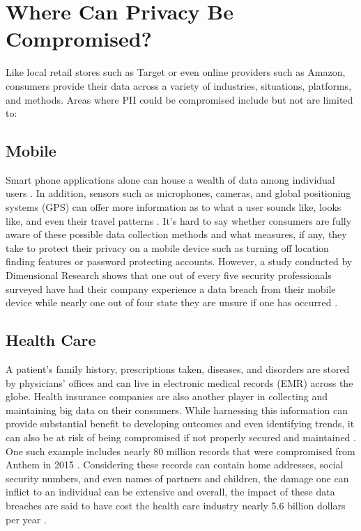 \documentclass[sigconf]{acmart}
\begin{document}
\section{Where Can Privacy Be Compromised?}
Like local retail stores such as Target or even online providers such as Amazon, consumers provide their data across a variety of industries, situations, platforms, and methods. Areas where PII could be compromised include but not are limited to:
  \subsection{Mobile} Smart phone applications alone can house a wealth of data among individual users \cite{Tene2013}. In addition, sensors such as microphones, cameras, and global positioning systems (GPS) can offer more information as to what a user sounds like, looks like, and even their travel patterns \cite{Tene2013}. It's hard to say whether consumers are fully aware of these possible data collection methods and what measures, if any, they take to protect their privacy on a mobile device such as turning off location finding features or password protecting accounts. However, a study conducted by Dimensional Research shows that one out of every five security professionals surveyed have had their company experience a data breach from their mobile device while nearly one out of four state they are unsure if one has occurred \cite{Collett2017}. 
  \subsection{Health Care} A patient's family history, prescriptions taken, diseases, and disorders are stored by physicians' offices and can live in electronic medical records (EMR) across the globe. Health insurance companies are also another player in collecting and maintaining big data on their consumers. While harnessing this information can provide substantial benefit to developing outcomes and even identifying trends, it can also be at risk of being compromised if not properly secured and maintained \cite{Tene2013}. One such example includes nearly 80 million records that were compromised from Anthem in 2015 \cite{Akpan2016}. Considering these records can contain home addresses, social security numbers, and even names of partners and children, the damage one can inflict to an individual can be extensive and overall, the impact of these data breaches are said to have cost the health care industry nearly 5.6 billion dollars per year \cite{Akpan2016}.
\end{document}
